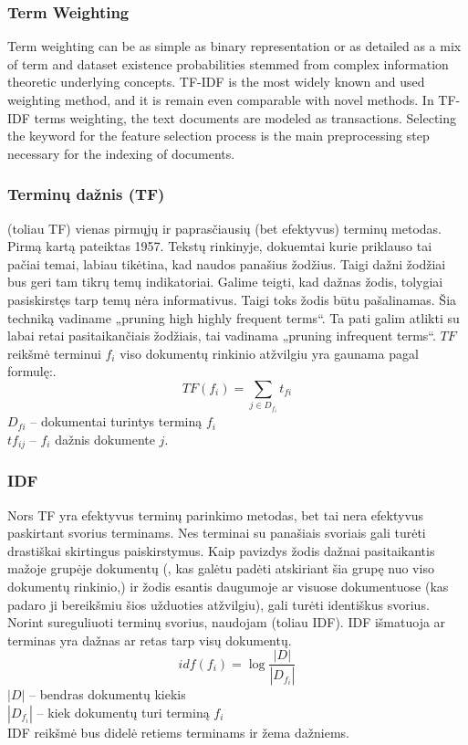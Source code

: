 \documentclass{VUMIFInfKursinis}
\begin{document}
\subsubsection{Term Weighting}
Term weighting can be as simple as binary representation or as detailed as a mix of term and dataset existence probabilities stemmed from complex information theoretic underlying concepts. TF-IDF is the most widely known and used weighting method, and it is remain even comparable with novel methods. In TF-IDF terms weighting, the text documents are modeled as transactions.  Selecting the keyword for the feature selection process is the main preprocessing step necessary for the indexing of documents.
\subsubsection{Terminų dažnis (TF)}
 (toliau TF) vienas pirmųjų ir paprasčiausių (bet efektyvus) terminų metodas. Pirmą kartą pateiktas 1957\cite{luhn1957statistical}. Tekstų rinkinyje, dokuemtai kurie priklauso tai pačiai temai, labiau tikėtina, kad naudos panašius žodžius. Taigi dažni žodžiai bus geri tam tikrų temų indikatoriai. Galime teigti, kad dažnas žodis, tolygiai pasiskirstęs tarp temų nėra informativus. Taigi toks žodis būtu pašalinamas. Šia techniką vadiname „pruning high highly frequent terms“. Ta pati galim  atlikti su labai retai pasitaikančiais žodžiais, tai vadinama „pruning infrequent terms“.
$TF$ reikšmė terminui $f_i$ viso dokumentų rinkinio atžvilgiu yra gaunama pagal formulę:.
\begin{equation}
	TF(f_i)=\sum_{j\in D_{f_i}} t_{fi}
\end{equation}
$D_{fi}$ – dokumentai turintys terminą $f_i$\\ 
$tf_{ij}$ – $f_i$ dažnis  dokumente $j$.

\subsubsection{IDF}
Nors TF yra efektyvus terminų parinkimo metodas, bet tai nera efektyvus paskirtant svorius terminams. Nes terminai su panašiais svoriais gali turėti drastiškai skirtingus paiskirstymus. Kaip pavizdys žodis dažnai pasitaikantis mažoje grupėje dokumentų (, kas galėtu padėti atskiriant šia grupę nuo viso dokumentų rinkinio,) ir žodis esantis daugumoje ar visuose dokumentuose (kas padaro ji bereikšmiu šios užduoties atžvilgiu), gali turėti identiškus svorius. Norint sureguliuoti terminų svorius, naudojam  (toliau IDF). IDF išmatuoja ar terminas yra dažnas ar retas tarp visų dokumentų.
\begin{equation}
	idf(f_i)=\log\frac{|D|}{|D_{f_i}|}
\end{equation}
$|D|$ – bendras dokumentų kiekis\\
$|D_{f_i}|$  – kiek dokumentų turi terminą $f_i$\\
IDF reikšmė bus didelė retiems terminams ir žema dažniems.
\end{document}
